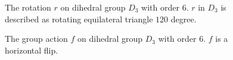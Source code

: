 \begin{figure}[ht]
    \centering
\end{figure}
\begin{figure}[ht]
    \centering
\end{figure}
\begin{figure}[ht]
    \centering
    \caption{The rotation $r$ on dihedral group $D_3$ with order 6. $r$ in $D_3$ is described as rotating equilateral triangle $120$ degree.}
\end{figure}

\begin{figure}[ht]
    \centering
    \caption{The group action $f$ on dihedral group $D_3$ with order 6. $f$ is a horizontal flip.}
\end{figure}

